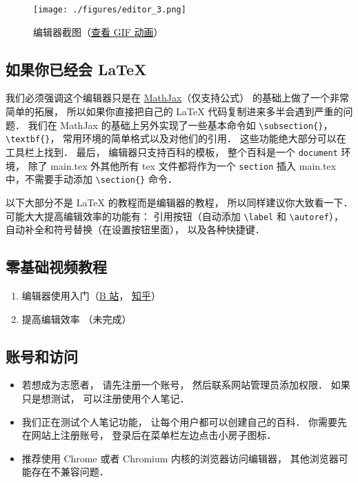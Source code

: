 
\begin{figure}[ht]
\centering
\texttt{[image: ./figures/editor\_3.png]}
\caption{编辑器截图（\href{https://wuli.wiki/apps/editor.gif}{查看 GIF 动画}）} \label{editor_fig3}
\end{figure}

\subsection{如果你已经会 LaTeX}
我们必须强调这个编辑器只是在 \href{https://www.mathjax.org/}{MathJax}（仅支持公式） 的基础上做了一个非常简单的拓展， 所以如果你直接把自己的 LaTeX 代码复制进来多半会遇到严重的问题． 我们在 MathJax 的基础上另外实现了一些基本命令如 \verb|\subsection{}|， \verb|\textbf{}|， 常用环境的简单格式以及对他们的引用． 这些功能绝大部分可以在工具栏上找到． 最后， 编辑器只支持百科的模板， 整个百科是一个 \verb|document| 环境， 除了 main.tex 外其他所有 tex 文件都将作为一个 \verb|section| 插入 main.tex 中，不需要手动添加 \verb|\section{}| 命令．

以下大部分不是 LaTeX 的教程而是编辑器的教程， 所以同样建议你大致看一下． 可能大大提高编辑效率的功能有： 引用按钮（自动添加 \verb|\label| 和 \verb|\autoref|）， 自动补全和符号替换（在设置按钮里面）， 以及各种快捷键．

\subsection{零基础视频教程}
\begin{enumerate}
\item 编辑器使用入门（\href{https://www.bilibili.com/video/av87698355/}{B 站}， \href{https://zhuanlan.zhihu.com/p/105869878}{知乎}）
\item 提高编辑效率 （未完成）
\end{enumerate}

\subsection{账号和访问}
\begin{itemize}
\item 若想成为志愿者， 请先注册一个账号， 然后联系网站管理员添加权限． 如果只是想测试， 可以注册使用个人笔记．
\item 我们正在测试个人笔记功能， 让每个用户都可以创建自己的百科． 你需要先在网站上注册账号， 登录后在菜单栏左边点击小房子图标．
\item 推荐使用 Chrome 或者 Chromium 内核的浏览器访问编辑器， 其他浏览器可能存在不兼容问题．
\end{itemize}

